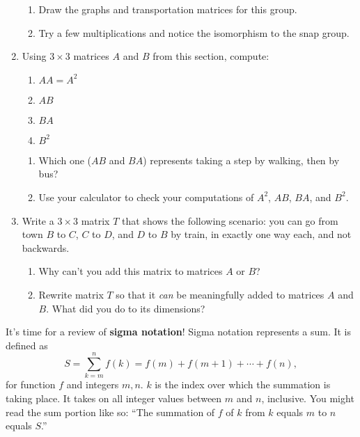\documentclass[../gatm.tex]{subfiles}
\begin{document}
\begin{enumerate}
\begin{enumerate}
\item Draw the graphs and transportation matrices for this group.
\item Try a few multiplications and notice the isomorphism to the snap group.
\end{enumerate}
\item Using $3\times 3$ matrices $A$ and $B$ from this section, compute:
\begin{multicols}{4}
\begin{enumerate}
\item $AA=A^2$
\item $AB$
\item $BA$
\item $B^2$
\setcounter{mtrx_mult_problem_ii}{\value{enumii}}
\end{enumerate}
\end{multicols}
\begin{enumerate}
\setcounter{enumii}{\value{mtrx_mult_problem_ii}}
\item Which one ($AB$ and $BA$) represents taking a step by walking, then by bus?
\item Use your calculator to check your computations of $A^2$, $AB$, $BA$, and $B^2$.
\end{enumerate}
\item Write a $3\times 3$ matrix $T$ that shows the following scenario: you can go from town $B$ to $C$, $C$ to $D$, and $D$ to $B$ by train, in exactly one way each, and not backwards.
\begin{enumerate}
\item Why can't you add this matrix to matrices $A$ or $B$?
\item Rewrite matrix $T$ so that it \textit{can} be meaningfully added to matrices $A$ and $B$. What did you do to its dimensions?
\end{enumerate}
\setcounter{mtrx_mult_problem_i}{\value{enumi}}
\end{enumerate}

\noindent It's time for a review of \textbf{sigma notation}! Sigma notation represents a sum. It is defined as
$$S=\sum_{k=m}^{n} f(k)=f(m)+f(m+1)+\cdots + f(n),$$
for function $f$ and integers $m,n$. $k$ is the index over which the summation is taking place. It takes on all integer values between $m$ and $n$, inclusive. You might read the sum portion like so: ``The summation of $f$ of $k$ from $k$ equals $m$ to $n$ equals $S$.''
\end{document}
